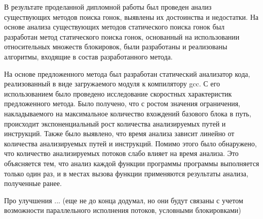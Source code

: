 \Conclusion

В результате проделанной дипломной работы был проведен анализ существующих методов поиска гонок, выявлены их достоинства и недостатки. На основе анализа существующих методов статического поиска гонок был разработан метод статического поиска гонок, основанный на использовании относительных множеств блокировок, были разработаны и реализованы алгоритмы, входящие в состав разработанного метода.

На основе предложенного метода был разработан статический анализатор кода, реализованный в виде загружаемого модуля к компилятору gcc. С его использованием было проведено исследование скоростных характеристик предложенного метода. Было получено, что с ростом значения ограничения, накладываемого на максимальное количество вхождений базового блока в путь, происходит экспоненциальный рост количества анализируемых путей и инструкций. Также было выявлено, что время анализа  зависит линейно от количества анализируемых путей и инструкций. Помимо этого было обнаружено, что количество анализируемых  потоков слабо влияет на время анализа. Это объясняется тем, что анализ каждой функции программы программы выполняется только один раз, и в местах вызова функции применяются результаты анализа, полученные ранее.

Про улучшения ... (еще не до конца додумал, но они будут связаны с учетом возможности параллельного исполнения потоков, условными блокировками)
